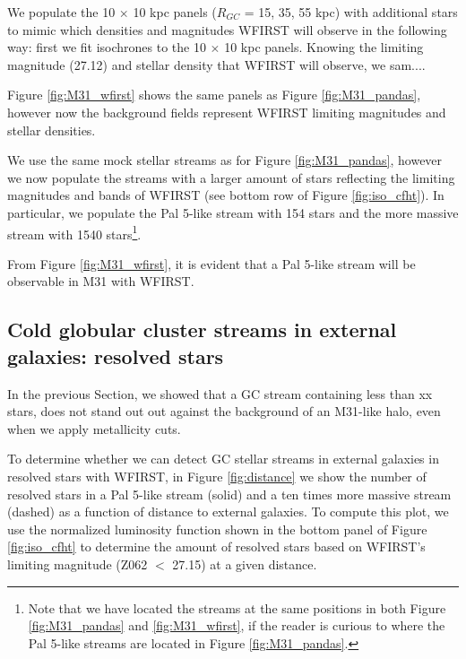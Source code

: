 \documentclass[twocolumn]{aastex62}
\begin{document}
We populate the 10 $\times$ 10 kpc panels ($R_{GC}$ = 15, 35, 55 kpc) with  additional stars to mimic which densities and magnitudes WFIRST will observe in the following way: first we fit isochrones to the 10 $\times$ 10 kpc panels. Knowing the limiting magnitude (27.12) and stellar density that  WFIRST will observe, we sam....

Figure \ref{fig:M31_wfirst} shows the same panels as Figure \ref{fig:M31_pandas}, however now the background fields represent WFIRST limiting magnitudes and stellar densities.

We use the same mock stellar streams as for Figure \ref{fig:M31_pandas}, however we now populate the streams with a larger amount of stars reflecting the limiting magnitudes and bands of WFIRST (see bottom row of Figure \ref{fig:iso_cfht}). In particular, we populate the Pal 5-like stream with 154 stars and the more massive stream with 1540 stars\footnote{Note that we have located the streams at the same positions in both Figure \ref{fig:M31_pandas} and \ref{fig:M31_wfirst}, if the reader is curious to where the Pal 5-like streams are located in Figure  \ref{fig:M31_pandas}.}.

From Figure \ref{fig:M31_wfirst}, it is evident that a Pal 5-like stream will be observable in M31 with WFIRST. 



\subsection{Cold globular cluster streams in external galaxies: resolved stars}
\label{sec:resother}
In the previous Section, we showed that a GC stream containing less than xx stars, does not stand out out against the background of an M31-like halo, even when we apply metallicity cuts. 

To determine whether we can detect GC stellar streams in external galaxies in resolved stars with WFIRST, in Figure \ref{fig:distance} we show the number of resolved stars in a Pal 5-like stream (solid) and a ten times more massive stream (dashed) as a function of distance to external galaxies. To compute this plot, we use the normalized luminosity function shown in the bottom panel of Figure \ref{fig:iso_cfht} to determine the amount of resolved stars based on WFIRST's limiting magnitude (Z062 $<$ 27.15) at a given distance.
\end{document}

